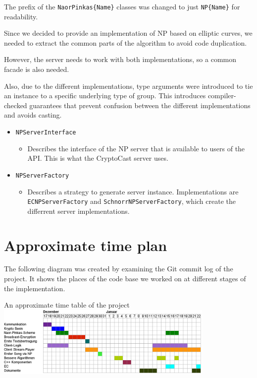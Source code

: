 \documentclass[a4paper,10pt]{scrartcl}
\begin{document}
The prefix of the \lstinline|NaorPinkas{Name}| classes was changed to just \lstinline|NP{Name}| for readability.

Since we decided to provide an implementation of NP based on elliptic curves, we needed to extract
the common parts of the algorithm to avoid code duplication.

However, the server needs to work with both implementations, so a common facade is also needed.

Also, due to the different implementations, type arguments were introduced to tie an instance
to a specific underlying type of group. This introduces compiler-checked guarantees that prevent
confusion between the different implementations and avoids casting.

\begin{itemize}
  \item \lstinline|NPServerInterface|
  \begin{itemize}
    \item Describes the interface of the NP server that is available to users of the API.
          This is what the CryptoCast server uses.
  \end{itemize}

  \item \lstinline|NPServerFactory|
  \begin{itemize}
    \item Describes a strategy to generate server instance. Implementations are
          \lstinline|ECNPServerFactory| and \lstinline|SchnorrNPServerFactory|, which
          create the differrent server implementations.
  \end{itemize}
\end{itemize}

\section{Approximate time plan}

The following diagram was created by examining the Git commit log of the project. It shows
the places of the code base we worked on at different stages of the implementation.

\begin{illustration}{An approximate time table of the project}
\includegraphics[width=400px]{timetable.png}
\end{illustration}
\end{document}
